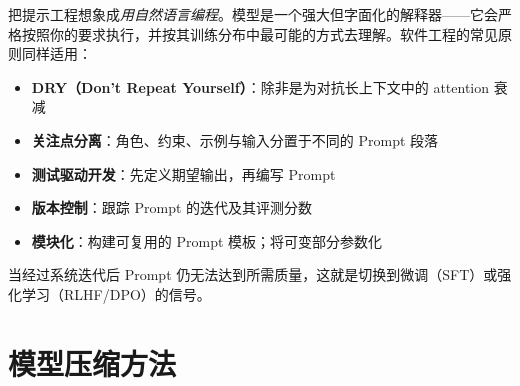 \begin{intuitionbox}[提示工程的心智模型]
把提示工程想象成\emph{用自然语言编程}。模型是一个强大但字面化的解释器——它会严格按照你的要求执行，并按其训练分布中最可能的方式去理解。软件工程的常见原则同样适用：

\begin{itemize}
  \item \textbf{DRY（Don't Repeat Yourself）}：除非是为对抗长上下文中的 attention 衰减
  \item \textbf{关注点分离}：角色、约束、示例与输入分置于不同的 Prompt 段落
  \item \textbf{测试驱动开发}：先定义期望输出，再编写 Prompt
  \item \textbf{版本控制}：跟踪 Prompt 的迭代及其评测分数
  \item \textbf{模块化}：构建可复用的 Prompt 模板；将可变部分参数化
\end{itemize}

当经过系统迭代后 Prompt 仍无法达到所需质量，这就是切换到微调（SFT）或强化学习（RLHF/DPO）的信号。
\end{intuitionbox}

\section{模型压缩方法}
\label{model-compression-methods}

